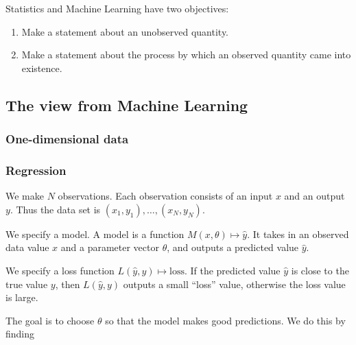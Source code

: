 \documentclass[12pt]{article}
\begin{document}
Statistics and Machine Learning have two objectives:

\begin{enumerate}
\item Make a statement about an unobserved quantity.
\item Make a statement about the process by which an observed quantity came into existence.
\end{enumerate}


\subsection*{The view from Machine Learning}

\subsubsection*{One-dimensional data}

\subsubsection*{Regression}
We make $N$ observations. Each observation consists of an input $x$ and an output $y$. Thus the
data set is $(x_1, y_1), \ldots, (x_N, y_N)$.

We specify a model. A model is a function $M(x, \theta) \mapsto \hat y$. It takes in an observed data value $x$
and a parameter vector $\theta$, and outputs a predicted value $\hat y$.

We specify a loss function $L(\hat y, y) \mapsto \text{loss}$. If the predicted value $\hat y$ is close to the true
value $y$, then $L(\hat y, y)$ outputs a small ``loss'' value, otherwise the loss value is large.

The goal is to choose $\theta$ so that the model makes good predictions. We do this by finding
\end{document}
